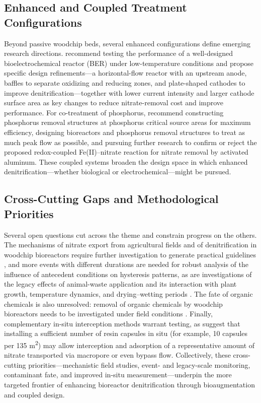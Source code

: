 \documentclass[11pt]{article}
\begin{document}
\subsection{Enhanced and Coupled Treatment Configurations}
Beyond passive woodchip beds, several enhanced configurations define emerging research directions. \textcite{Law2018} recommend testing the performance of a well-designed bioelectrochemical reactor (BER) under low-temperature conditions and propose specific design refinements---a horizontal-flow reactor with an upstream anode, baffles to separate oxidizing and reducing zones, and plate-shaped cathodes to improve denitrification---together with lower current intensity and larger cathode surface area as key changes to reduce nitrate-removal cost and improve performance. For co-treatment of phosphorus, \textcite{Penn2024} recommend constructing phosphorus removal structures at phosphorus critical source areas for maximum efficiency, designing bioreactors and phosphorus removal structures to treat as much peak flow as possible, and pursuing further research to confirm or reject the proposed redox-coupled Fe(II)--nitrate reaction for nitrate removal by activated aluminum. These coupled systems broaden the design space in which enhanced denitrification---whether biological or electrochemical---might be pursued.

\subsection{Cross-Cutting Gaps and Methodological Priorities}
Several open questions cut across the theme and constrain progress on the others. The mechanisms of nitrate export from agricultural fields and of denitrification in woodchip bioreactors require further investigation to generate practical guidelines \parencite{Liu2020}, and more events with different durations are needed for robust analysis of the influence of antecedent conditions on hysteresis patterns, as are investigations of the legacy effects of animal-waste application and its interaction with plant growth, temperature dynamics, and drying--wetting periods \parencite{Liu2020}. The fate of organic chemicals is also unresolved: removal of organic chemicals by woodchip bioreactors needs to be investigated under field conditions \parencite{Ilhan2011}. Finally, complementary in-situ interception methods warrant testing, as \textcite{Pampolino2000} suggest that installing a sufficient number of resin capsules in situ (for example, 10 capsules per 135 m\textsuperscript{2}) may allow interception and adsorption of a representative amount of nitrate transported via macropore or even bypass flow. Collectively, these cross-cutting priorities---mechanistic field studies, event- and legacy-scale monitoring, contaminant fate, and improved in-situ measurement---underpin the more targeted frontier of enhancing bioreactor denitrification through bioaugmentation and coupled design.

\printbibliography
\end{document}
